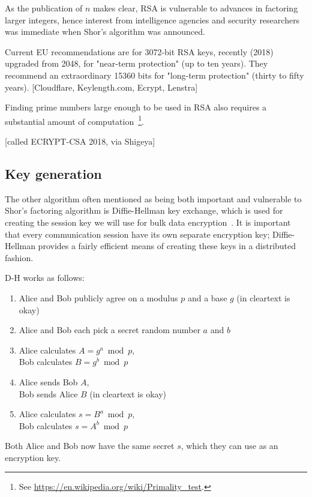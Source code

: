 As the publication of $n$ makes clear, RSA is vulnerable to advances
in factoring larger integers, hence interest from intelligence
agencies and security researchers was immediate when Shor's algorithm
was announced.

Current EU recommendations are for 3072-bit RSA keys, recently (2018)
upgraded from 2048, for "near-term protection" (up to ten years).
They recommend an extraordinary 15360 bits for "long-term protection"
(thirty to fifty years). [Cloudflare, Keylength.com, Ecrypt, Lenstra]

Finding prime numbers large enough to be used in RSA also requires a
substantial amount of computation~\footnote{See
  \url{https://en.wikipedia.org/wiki/Primality_test}.}.

[called ECRYPT-CSA 2018, via Shigeya]

\subsection{Key generation}

The other algorithm often mentioned as being both important and
vulnerable to Shor's factoring algorithm is Diffie-Hellman key
exchange, which is used for creating the session key we will use for
bulk data encryption~\cite{diffie1976new}.  It is important that every
communication session have its own separate encryption key;
Diffie-Hellman provides a fairly efficient means of creating these
keys in a distributed fashion.

D-H works as follows:

\begin{enumerate}
  \item Alice and Bob publicly agree on a modulus $p$ and a base $g$ (in cleartext is okay)
  \item Alice and Bob each pick a secret random number $a$ and $b$
  \item Alice calculates $A = g^a \bmod p$, \\
    Bob calculates $B = g^b \bmod p$
  \item Alice sends Bob $A$, \\
Bob sends Alice $B$ (in cleartext is okay)
  \item Alice calculates $s = B^a \bmod p$, \\
	   Bob calculates $s = A^b \bmod p$
\end{enumerate}

Both Alice and Bob now have the same secret $s$, which they can use as
an encryption key.

